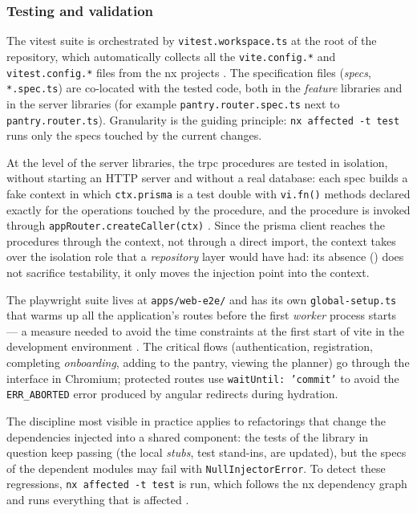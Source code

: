 \subsubsection{Testing and validation}\label{subsec:testare-validare}

The \gls{vitest} suite is orchestrated by \texttt{vitest.workspace.ts} at the root of the repository, which automatically collects all the \texttt{vite.config.*} and \texttt{vitest.config.*} files from the \gls{nx} projects \cite{vitest,vite}. The specification files (\textit{specs}, \texttt{*.spec.ts}) are co-located with the tested code, both in the \textit{feature} libraries and in the server libraries (for example \texttt{pantry.router.spec.ts} next to \texttt{pantry.router.ts}). Granularity is the guiding principle: \texttt{nx affected -t test} runs only the specs touched by the current changes.

At the level of the server libraries, the \gls{trpc} procedures are tested in isolation, without starting an HTTP server and without a real database: each spec builds a fake context in which \texttt{ctx.prisma} is a test double with \texttt{vi.fn()} methods declared exactly for the operations touched by the procedure, and the procedure is invoked through \texttt{appRouter.createCaller(ctx)} \cite{trpc,vitest}. Since the \gls{prisma} client reaches the procedures through the context, not through a direct import, the context takes over the isolation role that a \textit{repository} layer would have had: its absence () does not sacrifice testability, it only moves the injection point into the context.

The \gls{playwright} suite lives at \texttt{apps/web-e2e/} and has its own \texttt{global-setup.ts} that warms up all the application's routes before the first \textit{worker} process starts --- a measure needed to avoid the time constraints at the first start of \gls{vite} in the development environment \cite{playwright}. The critical flows (authentication, registration, completing \textit{onboarding}, adding to the pantry, viewing the planner) go through the interface in Chromium; protected routes use \texttt{waitUntil: 'commit'} to avoid the \texttt{ERR\_ABORTED} error produced by \gls{angular} redirects during \gls{hydration}.

The discipline most visible in practice applies to refactorings that change the dependencies injected into a shared component: the tests of the library in question keep passing (the local \textit{stubs}, test stand-ins, are updated), but the specs of the dependent modules may fail with \texttt{NullInjectorError}. To detect these regressions, \texttt{nx affected -t test} is run, which follows the \gls{nx} dependency graph and runs everything that is affected \cite{nx}.

